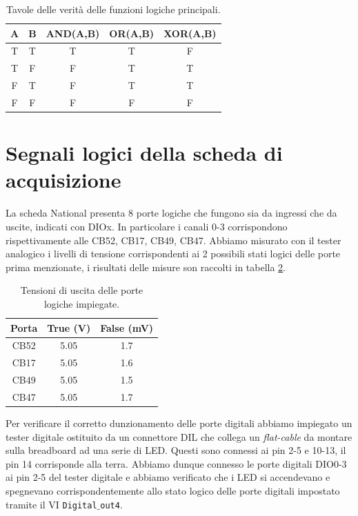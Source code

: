 \documentclass[journal, a4paper]{IEEEtran}
\begin{document}
\begin{table}[htp]
\centering
\caption{Tavole delle verità delle funzioni logiche principali.}
\label{tab:logic}
\begin{tabular}{|c|c|c|c|c|}
\hline 
A & B & AND(A,B) & OR(A,B) & XOR(A,B) \\ 
\hline 
T & T & T & T & F \\ 
\hline 
T & F & F & T & T \\ 
\hline 
F & T & F & T & T \\ 
\hline 
F & F & F & F & F \\ 
\hline 
\end{tabular} 
\end{table}

\section{Segnali logici della scheda di acquisizione}

La scheda National presenta 8 porte logiche che fungono sia da ingressi che da uscite, indicati con DIOx. In particolare i canali 0-3 corrispondono rispettivamente alle CB52, CB17, CB49, CB47. Abbiamo misurato con il tester analogico i livelli di tensione corrispondenti ai 2 possibili stati logici delle porte prima menzionate, i risultati delle misure son raccolti in tabella \ref{tab:volt}.

\begin{table}[htp]
\centering
\caption{Tensioni di uscita delle porte logiche impiegate.}
\label{tab:volt}
\begin{tabular}{|c|c|c|}
\hline 
Porta & True (V) & False (mV)\\ 
\hline 
CB52 & 5.05 & 1.7 \\ 
\hline 
CB17 & 5.05 & 1.6 \\ 
\hline 
CB49 & 5.05 & 1.5 \\ 
\hline 
CB47 & 5.05 & 1.7 \\ 
\hline 
\end{tabular} 
\end{table}

Per verificare il corretto dunzionamento delle porte digitali abbiamo impiegato un tester digitale ostituito da un connettore DIL che collega un \emph{flat-cable} da montare sulla breadboard ad una serie di LED. Questi sono connessi ai pin 2-5 e 10-13, il pin 14 corrisponde alla terra. Abbiamo dunque connesso le porte digitali DIO0-3 ai pin 2-5 del tester digitale e abbiamo verificato che i LED si accendevano e spegnevano corrispondentemente allo stato logico delle porte digitali impostato tramite il VI \texttt{Digital$\_$out4}.
\end{document}
